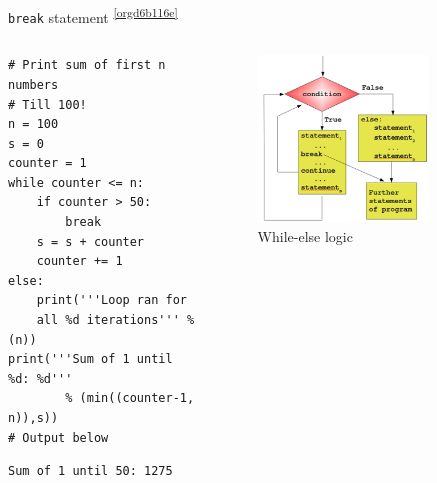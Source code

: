 \documentclass[presentation]{beamer}
\begin{document}
\begin{frame}[label={sec:org286b259},fragile]{\texttt{break} statement \textsuperscript{\ref{orgd6b116e}}}
 \begin{columns}
\begin{column}{0.48\columnwidth}
\scriptsize
\begin{verbatim}
# Print sum of first n numbers
# Till 100!
n = 100
s = 0
counter = 1
while counter <= n:
    if counter > 50:
        break
    s = s + counter
    counter += 1
else:
    print('''Loop ran for
    all %d iterations''' % (n))
print('''Sum of 1 until %d: %d'''
        % (min((counter-1, n)),s))
# Output below
\end{verbatim}

\begin{verbatim}
Sum of 1 until 50: 1275
\end{verbatim}
\end{column}


\begin{column}{0.45\columnwidth}
\footnotesize
\begin{figure}[htbp]
\centering
\includegraphics[width=0.8\textwidth]{images/while_loop_with_else_break.png}
\caption{While-else logic}
\end{figure}
\end{column}
\end{columns}
\end{frame}
\end{document}
